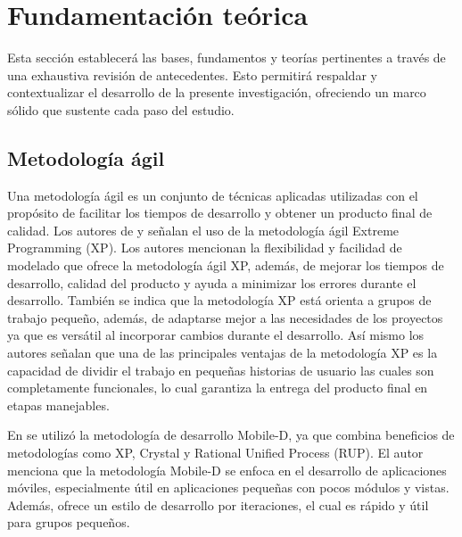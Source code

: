 \section{Fundamentación teórica}
Esta sección establecerá las bases, fundamentos y teorías pertinentes a través de una exhaustiva revisión de
antecedentes. Esto permitirá respaldar y contextualizar el desarrollo de la presente investigación, ofreciendo
un marco sólido que sustente cada paso del estudio.

\subsection{Metodología ágil}
Una metodología ágil es un conjunto de técnicas aplicadas utilizadas con el propósito de facilitar los tiempos de
desarrollo y obtener un producto final de calidad. Los autores de \cite{lesanoperezAplicativoMovilGeoubicacion2022} y
\cite{chicaizavillegasAplicacionWebPara2023}
señalan el uso de la
metodología ágil Extreme Programming (XP). Los autores
mencionan la flexibilidad y facilidad de modelado que ofrece la metodología ágil XP, además, de mejorar los tiempos
de desarrollo, calidad del producto y ayuda a minimizar los errores durante el desarrollo. También
se indica que la metodología XP está orienta a grupos de
trabajo pequeño, además, de adaptarse mejor a las necesidades de los proyectos ya que es versátil al incorporar
cambios durante el desarrollo. Así mismo los autores señalan que una de las
principales ventajas de la metodología XP es la capacidad de dividir el trabajo en pequeñas historias de usuario
las cuales son completamente funcionales, lo cual garantiza la entrega
del producto final en etapas manejables.

\bigbreak
En \cite{chasichangoAplicacionMovilApoyo2022} se utilizó la metodología de desarrollo Mobile-D, ya que combina
beneficios de metodologías como XP, Crystal y Rational Unified Process (RUP). El autor menciona que la metodología Mobile-D se enfoca en el
desarrollo de aplicaciones móviles, especialmente útil en aplicaciones pequeñas con pocos módulos y vistas. Además,
ofrece un estilo de desarrollo por iteraciones, el cual es rápido y útil para grupos pequeños.

